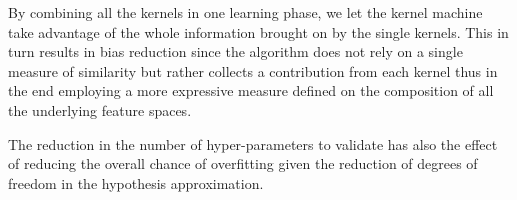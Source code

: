 
By combining all the kernels in one learning phase, we let the kernel machine
take advantage of the whole information brought on by the single kernels.
This in turn results in bias reduction since the algorithm does not rely on a single
measure of similarity but rather collects a contribution from each kernel thus
in the end employing a more expressive measure defined on the composition of all
the underlying feature spaces.

The reduction in the number of hyper-parameters to validate has also the effect
of reducing the overall chance of overfitting given the reduction of degrees of
freedom in the hypothesis approximation.

%

%

